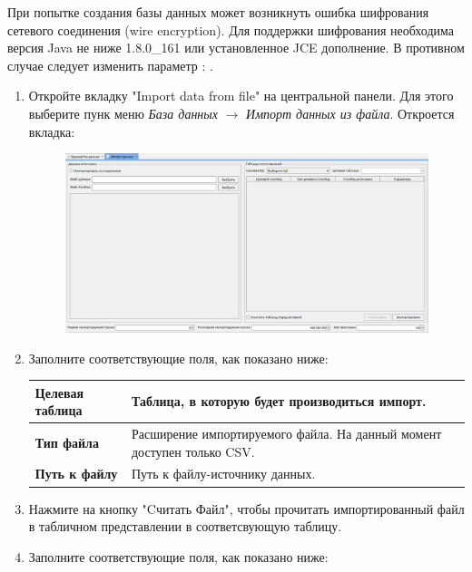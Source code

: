 \begin{redremark}
При попытке создания базы данных может возникнуть ошибка шифрования сетевого соединения (wire encryption). Для поддержки шифрования необходима версия Java не ниже 1.8.0\_161 или установленное JCE дополнение. В противном случае следует изменить параметр : .
\end{redremark}

\label{sec:import_data_from_file}

\begin{enumerate}
	\item Откройте вкладку "Import data from file" на центральной панели. Для этого выберите пунк меню \textit{База данных} $\rightarrow$ \textit{Импорт данных из файла}. Откроется вкладка:
	\begin{figure}[H]
		\centering
		\includegraphics[width = 0.95\linewidth]{img/ImportData.png}
	\end{figure}
	\item Заполните соответствующие поля, как показано ниже:
	\begin{longtable}[r]{|>{\bfseries}m{3.9cm}|m{11cm}|}
		\hline
		Целевая таблица & Таблица, в которую будет производиться импорт.\\\hline
		Тип файла & Расширение импортируемого файла. На данный момент доступен только CSV.\\\hline
		Путь к файлу & Путь к файлу-источнику данных.\\\hline
	\end{longtable}
	\item Нажмите на кнопку "Cчитать Файл", чтобы прочитать импортированный файл в табличном представлении в соответсвующую таблицу.
	\item Заполните соответствующие поля, как показано ниже:
	\begin{longtable}[r]{|>{\bfseries}m{3.9cm}|m{11cm}|}

\end{longtable}
\end{enumerate}
